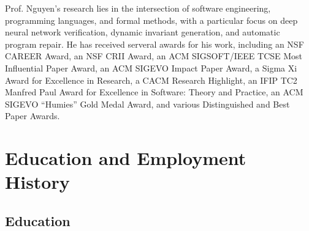 \documentclass[11pt]{article}
\begin{document}
{  Prof. Nguyen's research lies in the intersection of software engineering, programming languages, and formal methods, with a particular focus on deep neural network verification, dynamic invariant generation, and automatic program repair. He has received serveral awards for his work, including an NSF CAREER Award, an NSF CRII Award, an ACM SIGSOFT/IEEE TCSE Most Influential Paper Award, an ACM SIGEVO Impact Paper Award,  a Sigma Xi Award for Excellence in Research, a CACM Research Highlight, an IFIP TC2 Manfred Paul Award for Excellence in Software: Theory and Practice, an ACM SIGEVO ``Humies'' Gold Medal Award, and various Distinguished and Best Paper Awards.
}

\section{Education and Employment History}

\subsection{Education}
\end{document}
